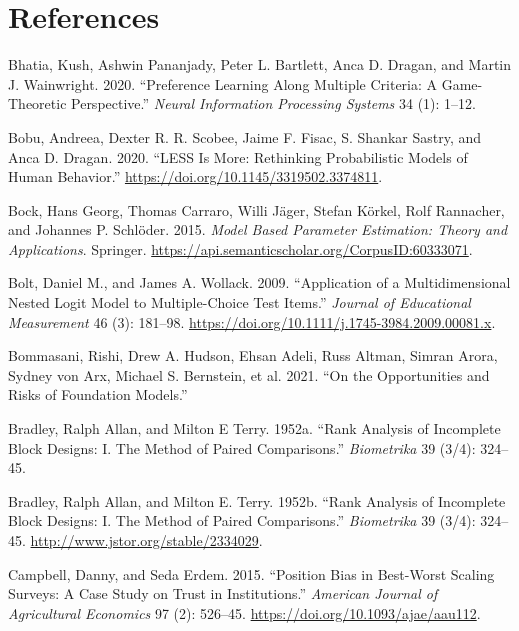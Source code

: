 \documentclass[
  letterpaper,
  numbers=noenddot,
  DIV=11]{scrreprt}
\newlength{\cslhangindent}
\newenvironment{CSLReferences}[2] %
 {\begin{list}{}{%
  \setlength{\itemindent}{0pt}
  \setlength{\leftmargin}{0pt}
  \setlength{\parsep}{0pt}
  \ifodd #1
   \setlength{\leftmargin}{\cslhangindent}
   \setlength{\itemindent}{-1\cslhangindent}
  \fi
  \setlength{\itemsep}{#2\baselineskip}}}
 {\end{list}}
\theoremstyle{definition}
\theoremstyle{plain}
\theoremstyle{plain}
\theoremstyle{remark}
\begin{document}
\section*{References}\label{bibliography-2}


\label{refs-2}
\begin{CSLReferences}{1}{0}
Bhatia, Kush, Ashwin Pananjady, Peter L. Bartlett, Anca D. Dragan, and
Martin J. Wainwright. 2020. {``Preference Learning Along Multiple
Criteria: A Game-Theoretic Perspective.''} \emph{Neural Information
Processing Systems} 34 (1): 1--12.

Bobu, Andreea, Dexter R. R. Scobee, Jaime F. Fisac, S. Shankar Sastry,
and Anca D. Dragan. 2020. {``LESS Is More: Rethinking Probabilistic
Models of Human Behavior.''}
\url{https://doi.org/10.1145/3319502.3374811}.

Bock, Hans Georg, Thomas Carraro, Willi Jäger, Stefan Körkel, Rolf
Rannacher, and Johannes P. Schlöder. 2015. \emph{Model Based Parameter
Estimation: Theory and Applications}. Springer.
\url{https://api.semanticscholar.org/CorpusID:60333071}.

Bolt, Daniel M., and James A. Wollack. 2009. {``Application of a
Multidimensional Nested Logit Model to Multiple-Choice Test Items.''}
\emph{Journal of Educational Measurement} 46 (3): 181--98.
\url{https://doi.org/10.1111/j.1745-3984.2009.00081.x}.

Bommasani, Rishi, Drew A. Hudson, Ehsan Adeli, Russ Altman, Simran
Arora, Sydney von Arx, Michael S. Bernstein, et al. 2021. {``On the
Opportunities and Risks of Foundation Models.''}

Bradley, Ralph Allan, and Milton E Terry. 1952a. {``Rank Analysis of
Incomplete Block Designs: I. The Method of Paired Comparisons.''}
\emph{Biometrika} 39 (3/4): 324--45.

Bradley, Ralph Allan, and Milton E. Terry. 1952b. {``Rank Analysis of
Incomplete Block Designs: I. The Method of Paired Comparisons.''}
\emph{Biometrika} 39 (3/4): 324--45.
\url{http://www.jstor.org/stable/2334029}.

Campbell, Danny, and Seda Erdem. 2015. {``Position Bias in Best-Worst
Scaling Surveys: A Case Study on Trust in Institutions.''}
\emph{American Journal of Agricultural Economics} 97 (2): 526--45.
\url{https://doi.org/10.1093/ajae/aau112}.


\end{CSLReferences}
\end{document}
